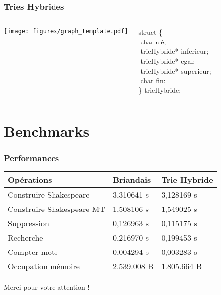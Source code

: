 \documentclass{beamer}
\begin{document}

\begin{frame}
\frametitle{Tries Hybrides}
\begin{columns}[c] %

\texttt{[image: figures/graph\_template.pdf]}

struct \{\\
   $\;$char clé;\\
   $\;$trieHybride* inferieur;\\
   $\;$trieHybride* egal;\\
   $\;$trieHybride* superieur;\\
   $\;$char fin;\\
\} trieHybride;

\end{columns}
\end{frame}

\section{Benchmarks}

\begin{frame}
\frametitle{Performances}
\begin{table}
\begin{tabular}{|l|l|l|}
\toprule
\textbf{Opérations} & \textbf{Briandais} & \textbf{Trie Hybride}\\
\midrule
Construire Shakespeare & 3,310641 s & 3,128169 s \\
Construire Shakespeare MT & 1,508106 s & 1,549025 s \\
Suppression & 0,126963 s & 0,115175 s \\
Recherche & 0,216970 s & 0,199453 s \\
Compter mots & 0,004294 s & 0,003283 s \\
Occupation mémoire & 2.539.008 B & 1.805.664 B \\
\bottomrule
\end{tabular}
\end{table}
\end{frame}


\begin{frame}
\Huge{\centerline{Merci pour votre attention !}}
\end{frame}

\end{document}
